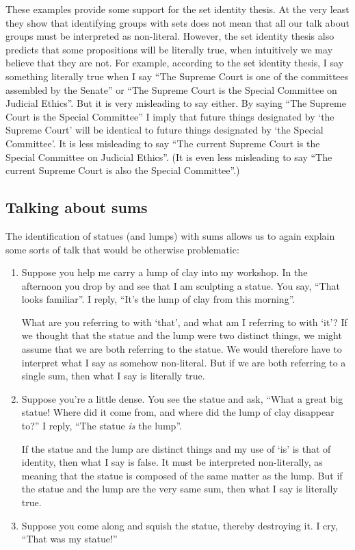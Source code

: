 \documentclass[12pt,twoside]{reedfancy}
\begin{document}
\begin{spacing}{1.25}
These examples provide some support for the set identity thesis.  At
the very least they show that identifying groups with sets does not
mean that all our talk about groups must be interpreted as
non-literal.  However, the set identity thesis also predicts that some
propositions will be literally true, when intuitively we may believe
that they are not.  For example, according to the set identity thesis,
I say something literally true when I say ``The Supreme Court is one
of the committees assembled by the Senate'' or ``The Supreme Court is
the Special Committee on Judicial Ethics''.  But it is very misleading
to say either.  By saying ``The Supreme Court is the Special
Committee'' I imply that future things designated by `the Supreme
Court' will be identical to future things designated by `the Special
Committee'.  It is less misleading to say ``The current Supreme Court
is the Special Committee on Judicial Ethics''.  (It is even less
misleading to say ``The current Supreme Court is also the Special
Committee''.)

\subsection{Talking about sums}
\label{sums-talk}
The identification of statues (and lumps) with sums allows us to again
explain some sorts of talk that would be otherwise problematic:

\begin{enumerate}
  \item Suppose you help me carry a lump of clay into my workshop.  In
    the afternoon you drop by and see that I am sculpting a statue.
    You say, ``That looks familiar''.  I reply, ``It's the lump of
    clay from this morning''.

    What are you referring to with `that', and what am I referring to
    with `it'?  If we thought that the statue and the lump were two
    distinct things, we might assume that we are both referring to the
    statue.  We would therefore have to interpret what I say as
    somehow non-literal.  But if we are both referring to a single
    sum, then what I say is literally true.

  \item Suppose you're a little dense.  You see the statue and ask,
    ``What a great big statue!  Where did it come from, and where did
    the lump of clay disappear to?''  I reply, ``The statue {\em is}
    the lump''.

    If the statue and the lump are distinct things and my use of `is'
    is that of identity, then what I say is false.  It must be
    interpreted non-literally, as meaning that the statue is composed
    of the same matter as the lump.  But if the statue and the lump
    are the very same sum, then what I say is literally true.
  \item Suppose you come along and squish the statue, thereby
    destroying it.  I cry, ``That was my statue!''


\end{enumerate}
\end{spacing}
\end{document}
